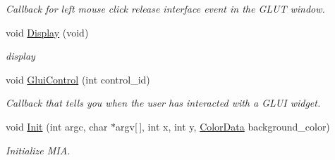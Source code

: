 \begin{DoxyCompactItemize}
\begin{DoxyCompactList}\small\item\em Callback for left mouse click release interface event in the G\+L\+UT window. \end{DoxyCompactList}\item 
void \hyperlink{classimage__tools_1_1MIAApp_add76b61a146970333b216e027aabc3bc}{Display} (void)\hypertarget{classimage__tools_1_1MIAApp_add76b61a146970333b216e027aabc3bc}{}\label{classimage__tools_1_1MIAApp_add76b61a146970333b216e027aabc3bc}

\begin{DoxyCompactList}\small\item\em display \end{DoxyCompactList}\item 
void \hyperlink{classimage__tools_1_1MIAApp_a4e10cc8b814e12c16c38d4e2be3bf2bb}{Glui\+Control} (int control\+\_\+id)\hypertarget{classimage__tools_1_1MIAApp_a4e10cc8b814e12c16c38d4e2be3bf2bb}{}\label{classimage__tools_1_1MIAApp_a4e10cc8b814e12c16c38d4e2be3bf2bb}

\begin{DoxyCompactList}\small\item\em Callback that tells you when the user has interacted with a G\+L\+UI widget. \end{DoxyCompactList}\item 
void \hyperlink{classimage__tools_1_1MIAApp_ab5bd2eb36e76c8bb81bef6c56f6bf55d}{Init} (int argc, char $\ast$argv\mbox{[}$\,$\mbox{]}, int x, int y, \hyperlink{classimage__tools_1_1ColorData}{Color\+Data} background\+\_\+color)
\begin{DoxyCompactList}\small\item\em Initialize M\+IA. \end{DoxyCompactList}\end{DoxyCompactItemize}
